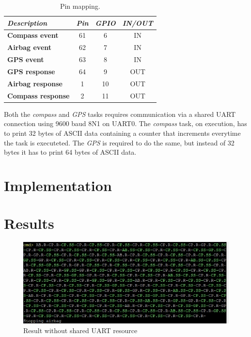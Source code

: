 \documentclass[10pt]{article}
\begin{document}
\begin{table}[H]
    \centering
    \begin{tabular}{|l|c|c|c|}
        \hline
        \textcolor{darkpink}{\textit{Description}}& \textcolor{darkpink}{\textit{Pin}} & \textcolor{darkpink}{\textit{GPIO}} &  \textcolor{darkpink}{\textit{IN/OUT}} \\
        \hline
        \textbf{Compass event} & 61 & 6 &  IN  \\
        \hline
        \textbf{Airbag event} & 62 &  7 &  IN  \\
        \hline
        \textbf{GPS event} & 63 & 8 &  IN  \\
        \hline
        \textbf{GPS response} & 64 & 9 &  OUT  \\
        \hline
        \textbf{Airbag response} & 1 & 10 &  OUT  \\
        \hline
        \textbf{Compass response} & 2 & 11 &  OUT  \\
        \hline
    \end{tabular}

    \caption{Pin mapping.}
    \label{tab:pins}
\end{table}

Both the \textit{compass} and \textit{GPS} tasks requires communication via a shared UART connection using 9600 baud 8N1 on UART0. The \textit{compass} task, on execution, has to print 32 bytes of ASCII data containing a counter
that increments everytime the task is executeted. The \textit{GPS} is required to do the same, but instead of 32 bytes it has to print 64 bytes of ASCII data.

\newpage
\section*{Implementation}



\newpage

\section*{Results}

\begin{figure}[H]
\caption{Result without shared UART resource}
\label{resNoUART}
\centering
\includegraphics[width=0.7\linewidth]{./images/result_no_uart.jpeg}
\end{figure}
\end{document}
